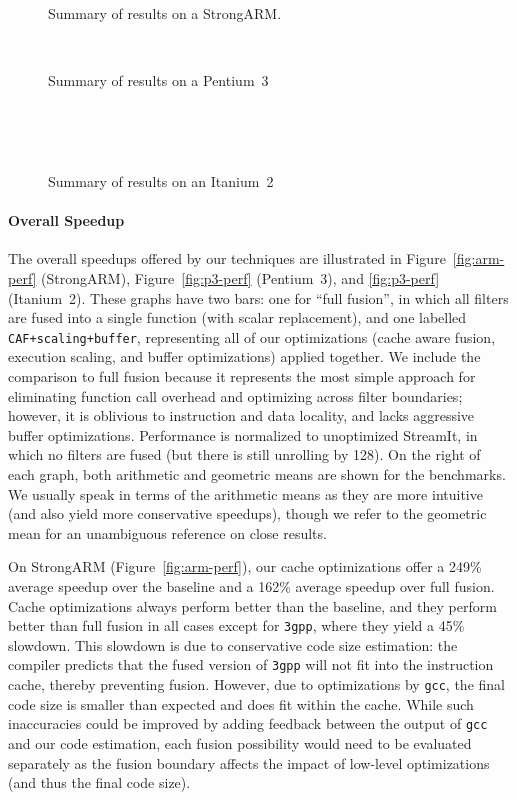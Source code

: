 \begin{figure}
\nocaptionrule
\begin{minipage}{3.35in}
\vspace{-14pt}
\caption{Summary of results on a StrongARM.\protect\label{fig:arm-perf}}
~ \\

\vspace{-14pt}
\caption{Summary of results on a Pentium~3\protect\label{fig:p3-perf}}
~ \\

\vspace{-14pt}
\caption{Summary of results on an Itanium~2\protect\label{fig:i2-perf}}
~ \\
\end{minipage}
\end{figure}

\paragraph*{Overall Speedup} 
The overall speedups offered by our techniques are illustrated in
Figure~\ref{fig:arm-perf} (StrongARM), Figure~\ref{fig:p3-perf}
(Pentium~3), and \ref{fig:p3-perf} (Itanium~2).  These graphs have two
bars: one for ``full fusion'', in which all filters are fused into a
single function (with scalar replacement), and one labelled {\tt
CAF+scaling+buffer}, representing all of our optimizations (cache
aware fusion, execution scaling, and buffer optimizations) applied
together.  We include the comparison to full fusion because it
represents the most simple approach for eliminating function call
overhead and optimizing across filter boundaries; however, it is
oblivious to instruction and data locality, and lacks aggressive
buffer optimizations.  Performance is normalized to unoptimized
StreamIt, in which no filters are fused (but there is still unrolling
by 128).  On the right of each graph, both arithmetic and geometric
means are shown for the benchmarks.  We usually speak in terms of the
arithmetic means as they are more intuitive (and also yield more
conservative speedups), though we refer to the geometric mean for an
unambiguous reference on close results.

On StrongARM (Figure~\ref{fig:arm-perf}), our cache optimizations
offer a 249\% average speedup over the baseline and a 162\%
average speedup over full fusion.  Cache optimizations always perform
better than the baseline, and they perform better than full fusion in
all cases except for \texttt{3gpp}, where they yield a 45\% slowdown.
This slowdown is due to conservative code size estimation: the
compiler predicts that the fused version of \texttt{3gpp} will not fit
into the instruction cache, thereby preventing fusion.  However, due
to optimizations by {\tt gcc}, the final code size is smaller than
expected and does fit within the cache.  While such inaccuracies could
be improved by adding feedback between the output of {\tt gcc} and our
code estimation, each fusion possibility would need to be evaluated
separately as the fusion boundary affects the impact of low-level
optimizations (and thus the final code size).

